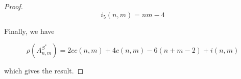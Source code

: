 \documentclass[12pt]{article}
\theoremstyle{plain}
\theoremstyle{definition}
\theoremstyle{remark}
\theoremstyle{definition}
\begin{document}
\begin{proof}
\begin{equation*}
    i_5(n,m)= nm-4
\end{equation*}


Finally, we have 

$$\rho(A^{S^*}_{n,m}) = 2cc(n,m) + 4c(n,m) -6(n+m-2) +i(n,m)$$

which gives the result. 

\end{proof}
\end{document}
